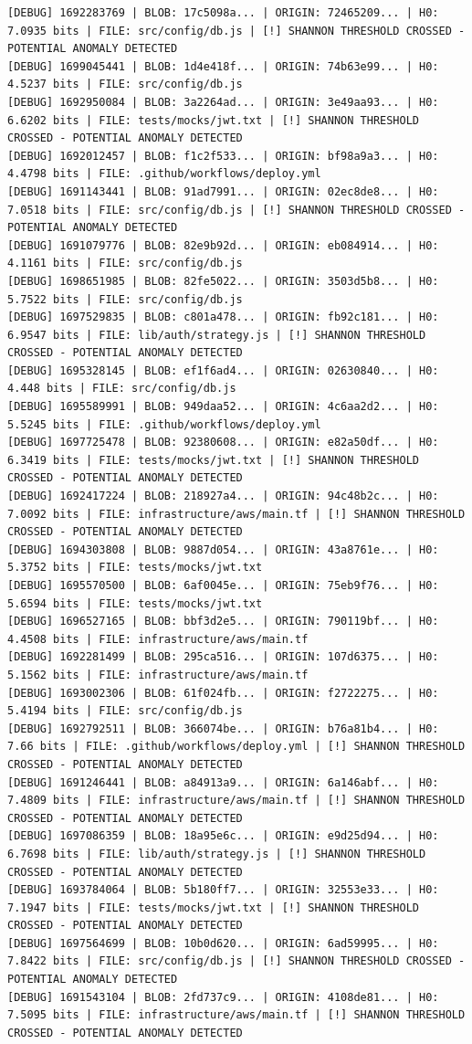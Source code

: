\documentclass[12pt, a4paper, oneside]{report}
\begin{document}
\begin{lstlisting}[basicstyle=\tiny\ttfamily]
[DEBUG] 1692283769 | BLOB: 17c5098a... | ORIGIN: 72465209... | H0: 7.0935 bits | FILE: src/config/db.js | [!] SHANNON THRESHOLD CROSSED - POTENTIAL ANOMALY DETECTED
[DEBUG] 1699045441 | BLOB: 1d4e418f... | ORIGIN: 74b63e99... | H0: 4.5237 bits | FILE: src/config/db.js
[DEBUG] 1692950084 | BLOB: 3a2264ad... | ORIGIN: 3e49aa93... | H0: 6.6202 bits | FILE: tests/mocks/jwt.txt | [!] SHANNON THRESHOLD CROSSED - POTENTIAL ANOMALY DETECTED
[DEBUG] 1692012457 | BLOB: f1c2f533... | ORIGIN: bf98a9a3... | H0: 4.4798 bits | FILE: .github/workflows/deploy.yml
[DEBUG] 1691143441 | BLOB: 91ad7991... | ORIGIN: 02ec8de8... | H0: 7.0518 bits | FILE: src/config/db.js | [!] SHANNON THRESHOLD CROSSED - POTENTIAL ANOMALY DETECTED
[DEBUG] 1691079776 | BLOB: 82e9b92d... | ORIGIN: eb084914... | H0: 4.1161 bits | FILE: src/config/db.js
[DEBUG] 1698651985 | BLOB: 82fe5022... | ORIGIN: 3503d5b8... | H0: 5.7522 bits | FILE: src/config/db.js
[DEBUG] 1697529835 | BLOB: c801a478... | ORIGIN: fb92c181... | H0: 6.9547 bits | FILE: lib/auth/strategy.js | [!] SHANNON THRESHOLD CROSSED - POTENTIAL ANOMALY DETECTED
[DEBUG] 1695328145 | BLOB: ef1f6ad4... | ORIGIN: 02630840... | H0: 4.448 bits | FILE: src/config/db.js
[DEBUG] 1695589991 | BLOB: 949daa52... | ORIGIN: 4c6aa2d2... | H0: 5.5245 bits | FILE: .github/workflows/deploy.yml
[DEBUG] 1697725478 | BLOB: 92380608... | ORIGIN: e82a50df... | H0: 6.3419 bits | FILE: tests/mocks/jwt.txt | [!] SHANNON THRESHOLD CROSSED - POTENTIAL ANOMALY DETECTED
[DEBUG] 1692417224 | BLOB: 218927a4... | ORIGIN: 94c48b2c... | H0: 7.0092 bits | FILE: infrastructure/aws/main.tf | [!] SHANNON THRESHOLD CROSSED - POTENTIAL ANOMALY DETECTED
[DEBUG] 1694303808 | BLOB: 9887d054... | ORIGIN: 43a8761e... | H0: 5.3752 bits | FILE: tests/mocks/jwt.txt
[DEBUG] 1695570500 | BLOB: 6af0045e... | ORIGIN: 75eb9f76... | H0: 5.6594 bits | FILE: tests/mocks/jwt.txt
[DEBUG] 1696527165 | BLOB: bbf3d2e5... | ORIGIN: 790119bf... | H0: 4.4508 bits | FILE: infrastructure/aws/main.tf
[DEBUG] 1692281499 | BLOB: 295ca516... | ORIGIN: 107d6375... | H0: 5.1562 bits | FILE: infrastructure/aws/main.tf
[DEBUG] 1693002306 | BLOB: 61f024fb... | ORIGIN: f2722275... | H0: 5.4194 bits | FILE: src/config/db.js
[DEBUG] 1692792511 | BLOB: 366074be... | ORIGIN: b76a81b4... | H0: 7.66 bits | FILE: .github/workflows/deploy.yml | [!] SHANNON THRESHOLD CROSSED - POTENTIAL ANOMALY DETECTED
[DEBUG] 1691246441 | BLOB: a84913a9... | ORIGIN: 6a146abf... | H0: 7.4809 bits | FILE: infrastructure/aws/main.tf | [!] SHANNON THRESHOLD CROSSED - POTENTIAL ANOMALY DETECTED
[DEBUG] 1697086359 | BLOB: 18a95e6c... | ORIGIN: e9d25d94... | H0: 6.7698 bits | FILE: lib/auth/strategy.js | [!] SHANNON THRESHOLD CROSSED - POTENTIAL ANOMALY DETECTED
[DEBUG] 1693784064 | BLOB: 5b180ff7... | ORIGIN: 32553e33... | H0: 7.1947 bits | FILE: tests/mocks/jwt.txt | [!] SHANNON THRESHOLD CROSSED - POTENTIAL ANOMALY DETECTED
[DEBUG] 1697564699 | BLOB: 10b0d620... | ORIGIN: 6ad59995... | H0: 7.8422 bits | FILE: src/config/db.js | [!] SHANNON THRESHOLD CROSSED - POTENTIAL ANOMALY DETECTED
[DEBUG] 1691543104 | BLOB: 2fd737c9... | ORIGIN: 4108de81... | H0: 7.5095 bits | FILE: infrastructure/aws/main.tf | [!] SHANNON THRESHOLD CROSSED - POTENTIAL ANOMALY DETECTED
\end{lstlisting}
\end{document}
